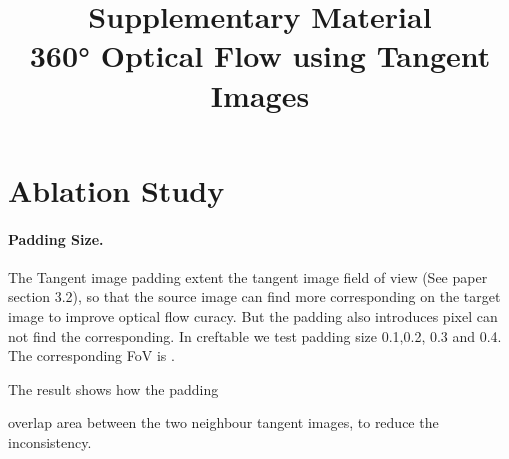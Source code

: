 \documentclass{bmvc2k}
\title{Supplementary Material \\
360\!° Optical Flow using Tangent Images}
\newcommand{\TODO}[1]{\textcolor{red}{{[TODO: #1]}}}
\begin{document}
\maketitle

%
%


%
%


\section{Ablation Study}
\label{sec:sup:ablations}


\paragraph{Padding Size.}

The Tangent image padding extent the tangent image field of view  (See paper section 3.2), so that the source image can find more corresponding on the target image to improve optical flow curacy.
%
But the padding also introduces pixel can not find the corresponding.
%
In cref{table} we test padding size 0.1,0.2, 0.3 and 0.4.
The corresponding FoV is .

The result shows how the padding 

overlap area between the two neighbour tangent images, to reduce the inconsistency.
\end{document}
